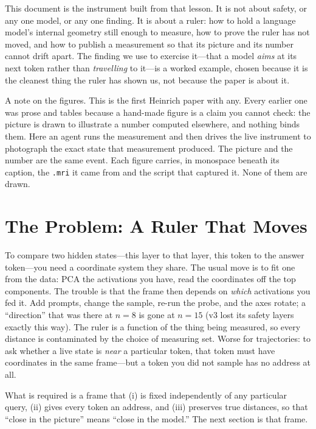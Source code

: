 \documentclass[11pt,a4paper]{article}
\newcommand{\mri}{\texttt{.mri}}
\begin{document}
This document is the instrument built from that lesson. It is not about safety, or
any one model, or any one finding. It is about a ruler: how to hold a language
model's internal geometry still enough to measure, how to prove the ruler has not
moved, and how to publish a measurement so that its picture and its number cannot
drift apart. The finding we use to exercise it---that a model \emph{aims} at its
next token rather than \emph{travelling} to it---is a worked example, chosen because
it is the cleanest thing the ruler has shown us, not because the paper is about it.

A note on the figures. This is the first Heinrich paper with any. Every earlier one
was prose and tables because a hand-made figure is a claim you cannot check: the
picture is drawn to illustrate a number computed elsewhere, and nothing binds them.
Here an agent runs the measurement and then drives the live instrument to photograph
the exact state that measurement produced. The picture and the number are the same
event. Each figure carries, in monospace beneath its caption, the \mri{} it came
from and the script that captured it. None of them are drawn.

\section{The Problem: A Ruler That Moves}

To compare two hidden states---this layer to that layer, this token to the answer
token---you need a coordinate system they share. The usual move is to fit one from
the data: PCA the activations you have, read the coordinates off the top components.
The trouble is that the frame then depends on \emph{which} activations you fed it. Add
prompts, change the sample, re-run the probe, and the axes rotate; a ``direction''
that was there at $n{=}8$ is gone at $n{=}15$ (v3 lost its safety layers exactly this
way). The ruler is a function of the thing being measured, so every distance is
contaminated by the choice of measuring set. Worse for trajectories: to ask whether a
live state is \emph{near} a particular token, that token must have coordinates in the
same frame---but a token you did not sample has no address at all.

What is required is a frame that (i) is fixed independently of any particular query,
(ii) gives every token an address, and (iii) preserves true distances, so that
``close in the picture'' means ``close in the model.'' The next section is that frame.
\end{document}
